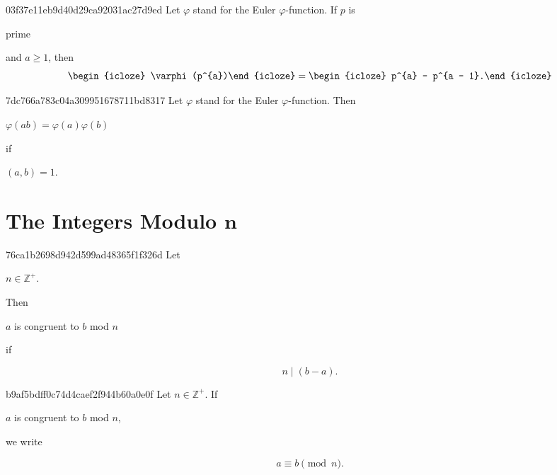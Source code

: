 \begin{note}{03f37e11eb9d40d29ca92031ac27d9ed}
    Let \({ \varphi }\) stand for the Euler \({ \varphi }\)-function.
    If \({ p }\) is \begin{icloze}{3}prime\end{icloze} and \({ a \geq 1 }\), then
    \[
        \begin{icloze}{2}\varphi(p^{a})\end{icloze} = \begin{icloze}{1}p^{a} - p^{a - 1}.\end{icloze}
    \]
\end{note}

\begin{note}{7dc766a783c04a309951678711bd8317}
    Let \({ \varphi }\) stand for the Euler \({ \varphi }\)-function.
    Then
    \begin{center}
        \begin{icloze}{1}\({ \varphi(ab) = \varphi(a) \varphi(b) }\)\end{icloze} \quad if \begin{icloze}{2}\({ (a, b) = 1 }\).\end{icloze}
    \end{center}
\end{note}

\section{The Integers Modulo \({ \mathbf{n} }\)}
\begin{note}{76ca1b2698d942d599ad48365f1f326d}
    Let \begin{icloze}{3}\({ n \in \mathbb Z^{+} }\).\end{icloze}
    Then \begin{icloze}{2}\({ a }\) is congruent to \({ b }\) mod \({ n }\)\end{icloze} if
    \begin{icloze}{1}
        \[
            n \mid (b - a).
        \]
    \end{icloze}
\end{note}

\begin{note}{b9af5bdff0c74d4caef2f944b60a0e0f}
    Let \({ n \in \mathbb Z^{+} }\).
    If \begin{icloze}{2}\({ a }\) is congruent to \({ b }\) mod \({ n }\),\end{icloze} we write
    \begin{icloze}{1}
        \[
            a \equiv b \pmod n.
        \]
    \end{icloze}
\end{note}

